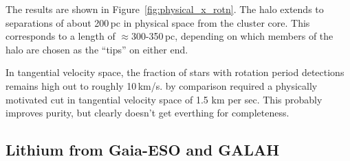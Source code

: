 \documentclass[12pt,twocolumn,tighten]{aastex63}
\begin{document}
The results are shown in Figure~\ref{fig:physical_x_rotn}.
The halo extends to separations of about 200\,pc in physical space
from the cluster core.
This corresponds to a length of $\approx$300-350\,pc, depending on
which members of the halo are chosen as the ``tips'' on either
end.

In tangential velocity space, the fraction of stars with rotation
period detections remains high out to roughly 10\,km/s.
\citet{meingast_2021} by comparison required a physically motivated
cut in tangential velocity space of 1.5 km per sec.  This probably
improves purity, but clearly doesn't get everthing for completeness.



\subsection{Lithium from Gaia-ESO and GALAH}
\label{subsec:lithium}
\end{document}
